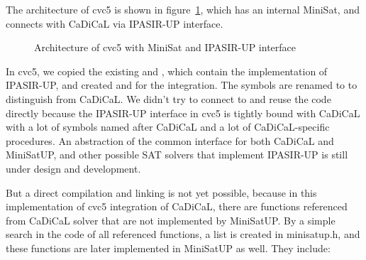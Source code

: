 The architecture of cvc5 is shown in figure~\ref{fig:cvc5}, which has an internal MiniSat, and connects with CaDiCaL via IPASIR-UP interface.

\begin{figure}[h!]
  \centering
  
  \caption{Architecture of cvc5 with MiniSat and IPASIR-UP interface}
  \label{fig:cvc5}
\end{figure}

In cvc5, we copied the existing  and , which contain the implementation of IPASIR-UP, and created  and  for the integration. The symbols are renamed to  to distinguish from CaDiCaL. We didn't try to connect to and reuse the code directly because the IPASIR-UP interface in cvc5 is tightly bound with CaDiCaL with a lot of symbols named after CaDiCaL and a lot of CaDiCaL-specific procedures. An abstraction of the common interface for both CaDiCaL and MiniSatUP, and other possible SAT solvers that implement IPASIR-UP is still under design and development.

But a direct compilation and linking is not yet possible, because in this implementation of cvc5 integration of CaDiCaL, there are functions referenced from CaDiCaL solver that are not implemented by MiniSatUP. By a simple search in the code of all referenced functions, a list is created in minisatup.h, and these functions are later implemented in MiniSatUP as well. They include:

